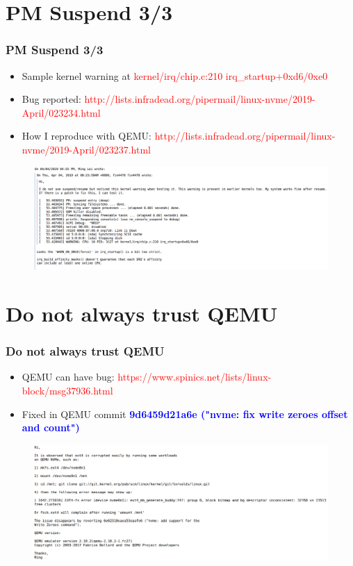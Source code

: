 \documentclass[aspectratio=169]{beamer}
\begin{document}

\section{PM Suspend 3/3}
\begin{frame}
\frametitle{PM Suspend 3/3}
\footnotesize
\begin{itemize}
\item Sample kernel warning at \textcolor{red}{kernel/irq/chip.c:210 irq\_startup+0xd6/0xe0}
\item Bug reported: \textcolor{red}{http://lists.infradead.org/pipermail/linux-nvme/2019-April/023234.html}
\item How I reproduce with QEMU: \textcolor{red}{http://lists.infradead.org/pipermail/linux-nvme/2019-April/023237.html}
\end{itemize}
\begin{figure}
\includegraphics[width=1.0\linewidth]{figures/freeze.pdf}
\end{figure}
\end{frame}


\section{Do not always trust QEMU}
\begin{frame}
\frametitle{Do not always trust QEMU}
\footnotesize
\begin{itemize}
\item QEMU can have bug: \textcolor{red}{https://www.spinics.net/lists/linux-block/msg37936.html}
\item Fixed in QEMU commit \textbf{\textcolor{blue}{9d6459d21a6e ("nvme: fix write zeroes offset and count")}}
\end{itemize}
\begin{figure}
\includegraphics[width=1.0\linewidth]{figures/qemu-bug.pdf}
\end{figure}
\end{frame}
\end{document}
